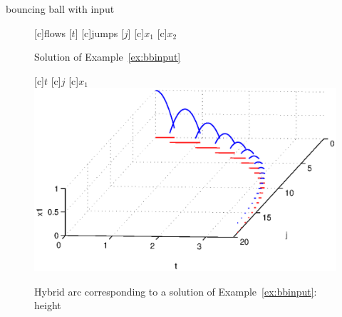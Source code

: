 \begin{example}{bouncing ball with input}
\begin{figure}[ht]
  \centering
  [c]{flows [$t$]}
  [c]{jumps [$j$]}
  [c]{$x_1$}
  [c]{$x_2$}
\qquad
{}
\caption{Solution of Example~\ref{ex:bbinput}}
\end{figure}

\begin{figure}[ht]
  \begin{center}
  [c]{$t$}
  [c]{$j$}
  [c]{$x_1$}
    {\includegraphics[width=.8\textwidth]{figures/Examples/HybridArc1.eps}}
   \caption{Hybrid arc corresponding to a solution of Example~\ref{ex:bbinput}: height}
\label{fig:input-3}
  \end{center}
\end{figure}


\end{example}

